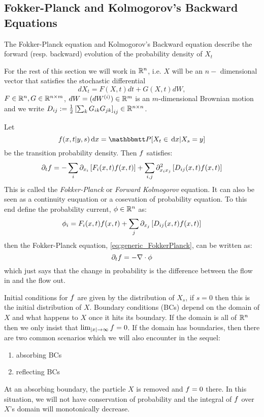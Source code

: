 \subsection{Fokker-Planck and Kolmogorov's Backward Equations}
The Fokker-Planck equation and Kolmogorov's Backward equation describe the
forward (resp. backward)  evolution of the probability density of $X_t$

For the rest of this section we will work in $ { \mathbb{R} }^n$, i.e. $X$ will be an $n-$
dimensional vector that satisfies the stochastic differential
\begin{equation}
dX_t = F(X,t) dt + G(X,t) dW,
\label{eq:generic_Ito_SDE_Rn}
\end{equation}
$F \in { \mathbb{R} }^n, G \in { \mathbb{R} }^{n \times m}$,
$dW = (dW^{(i)}) \in  { \mathbb{R} }^{  m}$ is an $m$-dimensional Brownian motion and we
write $D_{ij} :=
\tfrac{1}{2} 
\left[{\sum_k G_{ik} G_{jk} } \right]_{ij} \in { \mathbb{R} }^{n\times n} $.

Let 
\begin{equation}
 \f(x,t| y,s) \intd{x} =  \Prob[X_t \in \intd{x} | X_s = y]
 \label{eq:transition_prob_defn} 
 \end{equation}
be the transition probability density. Then ${f}$ satisfies:
\begin{equation}
{\partial}_t {f}= -\sum_i {\partial}_{x_i} \left[ F_i(x,t) {f}(x,t) \right] 
+ 
\sum_{i,j}  {\partial}^2_{x_i x_j} \left[ D_{ij}(x,t) {f}(x,t) \right]
\label{eq:generic_FokkerPlanck}
\end{equation} 
This is called the \emph{Fokker-Planck} or \emph{Forward Kolmogorov} equation.
It can also be seen as a continuity euquation or a cosevation of probability
equation. To this end define the probability current, ${ \phi } \in { \mathbb{R} }^n$ as:
$$
\phi_i =   F_i(x,t) {f}(x,t) 
+ 
\sum_{j}  {\partial}_{x_j} \left[ D_{ij}(x,t) {f}(x,t)\right]
$$
then the Fokker-Planck equation, \cref{eq:generic_FokkerPlanck}, can be written as:
$$
{\partial}_t {f}= -{ \nabla } \cdot \phi
$$
which just says that the change in probability is the
difference between the flow in and the flow out. 

Initial conditions for ${f}$ are given by the distribution of $X_s$, if $s=0$
then this is the initial distribution of $X$. Boundary conditions (BCs) depend
on the domain of $X$ and what happens to $X$ once it hits its boundary. If the domain
is all of ${ \mathbb{R} }^n$ then we only insist that $\lim_{|x| {\rightarrow} \infty} {f} = 0$. If the
domain has boundaries, then there are two common scenarios which we will also
encounter in the sequel:
\begin{enumerate}  
  \item absorbing BCs
  \item reflecting BCs
\end{enumerate}
At an absorbing boundary, the particle $X$ is removed and ${f}=0$ there.
In this situation, we will not have conservation of probability and the integral
of ${f}$ over $X$'s domain will monotonically decrease.

